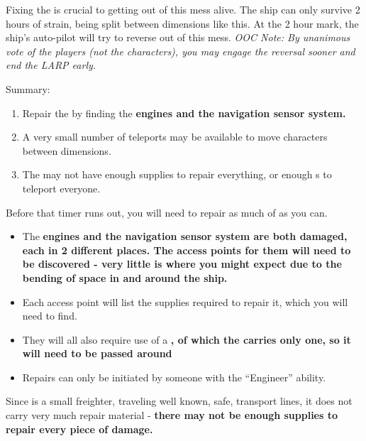 \documentclass[green]{TMFHope}
\begin{document}
\name{\gFixTheShip{}}

Fixing the \pNew{} is crucial to getting out of this mess alive. The ship can only survive 2 hours of strain, being split between dimensions like this. At the 2 hour mark, the ship's auto-pilot will try to reverse out of this mess. \emph{OOC Note: By unanimous vote of the players (not the characters), you may engage the reversal sooner and end the LARP early.}

Summary:
\begin{enumerate}
  \item Repair the \pNew{} by finding the \bf{engines} and the \bf{navigation sensor system}.
  \item A very small number of teleports may be available to move characters between dimensions.
	\item The \pNew{} may not have enough supplies to repair everything, or enough \iCrystal{}s to teleport everyone.
\end{enumerate}

Before that timer runs out, you will need to repair as much of \pNew{} as you can. 
\begin{itemize}
  \item The \bf{engines} and the \bf{navigation sensor system} are both damaged, each in 2 different places. The access points for them will need to be discovered - very little is where you might expect due to the bending of space in and around the ship. 
  \item Each access point will list the supplies required to repair it, which you will need to find. 
	\item They will all also require use of a \bf{\iTorch{}}, of which the \pNew{} carries only one, so it will need to be passed around
	\item Repairs can only be initiated by someone with the ``Engineer'' ability.
\end{itemize}
Since \pNew{} is a small freighter, traveling well known, safe, transport lines, it does not carry very much repair material - \bf{there may not be enough supplies to repair every piece of damage.}
\end{document}
